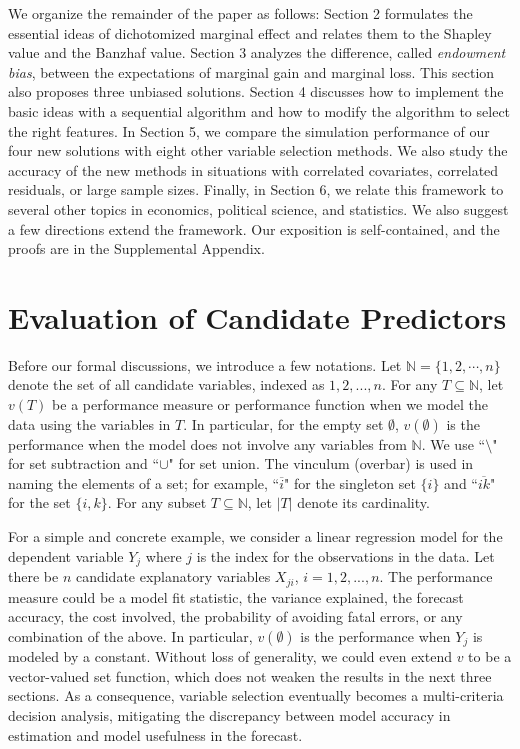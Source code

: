 \documentclass[a4paper,12pt]{article}
\begin{document}
We organize the remainder of the paper as follows: 
Section 2 formulates the essential ideas of dichotomized marginal effect and relates them to the Shapley value and the Banzhaf value. 
Section 3 analyzes the difference, called \textit{endowment bias}, between the expectations of marginal gain and marginal loss.
This section also proposes three unbiased solutions.
Section 4 discusses how to implement the basic ideas with a sequential algorithm and how to modify the algorithm to select the right features. 
In Section 5, we compare the simulation performance of our four new solutions with eight other variable selection methods.
We also study the accuracy of the new methods in situations with correlated covariates, correlated residuals, or large sample sizes.
Finally, in Section 6, we relate this framework to several other topics in economics, political science, and statistics. 
We also suggest a few directions extend the framework.
Our exposition is self-contained, and the proofs are in the Supplemental Appendix.



\section{Evaluation of Candidate Predictors}\label{sect:two_marginals}

\noindent Before our formal discussions, we introduce a few notations.
Let $\mathbb{N} = \{1, 2,\cdots,n\}$ denote the set of all candidate variables, indexed as $1,2,..., n$. 
For any $T\subseteq \mathbb{N}$, let $v(T)$ be a performance measure or performance function when we model the data using the variables in $T$.
In particular, for the empty set $\emptyset$, $v(\emptyset)$  is the performance  
when the model does not involve any variables from $\mathbb{N}$.
We use  ``$\setminus$" for set subtraction and ``$\cup$" for set union. 
The vinculum (overbar) is used in naming the elements of a set; for example,  ``$\overline{i}$"  for the singleton set $\{ i \}$ and ``$\overline{ik}$" for the set $\{i, k \}$.
For any subset $T\subseteq \mathbb{N}$, let $|T|$ denote its cardinality.

For a simple and concrete example, we consider a linear regression model for the dependent variable $Y_j$ where $j$ is the index for the observations in the data.
Let there be $n$ candidate explanatory variables $X_{ji}$, $i=1,2,...,n$.
The performance measure could be a model fit statistic, the variance explained, the forecast accuracy, 
the cost involved, the probability of avoiding fatal errors, or any combination of the above. 
In particular, $v(\emptyset)$ is the performance when $Y_j$ is modeled by a constant.
Without loss of generality, we could even extend $v$ to be a vector-valued set function, which does not weaken the results in the next three sections.  
As a consequence, variable selection eventually becomes a multi-criteria decision analysis,  mitigating the discrepancy between model accuracy in estimation and model usefulness in the forecast. 
\end{document}
